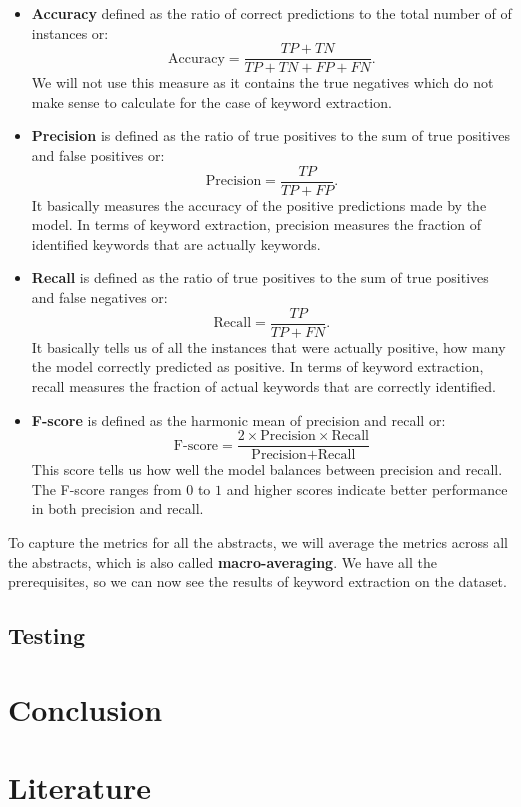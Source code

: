 \documentclass[12pt]{article}
\numberwithin{equation}{section}
\begin{document}
\begin{spacing}{1.5}
	\begin{itemize}
		\item \textbf{Accuracy} defined as the ratio of correct predictions to the total number of of instances or:
		$$ \text{Accuracy} = \frac{TP + TN}{TP + TN + FP + FN}. $$
		We will not use this measure as it contains the true negatives which do not make sense to calculate for the case of keyword extraction.
		\item \textbf{Precision} is defined as the ratio of true positives to the sum of true positives and false positives or:
		$$ \text{Precision} = \frac{TP}{TP + FP}. $$
		It basically measures the accuracy of the positive predictions made by the model. In terms of keyword extraction, precision measures the fraction of identified keywords that are actually keywords.
		
		\item \textbf{Recall} is defined as the ratio of true positives to the sum of true positives and false negatives or:
		$$ \text{Recall} = \frac{TP}{TP + FN}. $$
		It basically tells us of all the instances that were actually positive, how many the model correctly predicted as positive. In terms of keyword extraction, recall measures the fraction of actual keywords that are correctly identified.
		\item \textbf{F-score} is defined as the harmonic mean of precision and recall or:
		$$ \text{F-score} = \frac{2 \times \text{Precision} \times \text{Recall}}{\text{Precision} + \text{Recall}} $$
		This score tells us how well the model balances between precision and recall. The F-score ranges from $0$ to $1$ and higher scores indicate better performance in both precision and recall.  
	\end{itemize}
	To capture the metrics for all the abstracts, we will average the metrics across all the abstracts, which is also called \textbf{macro-averaging}. We have all the prerequisites, so we can now see the results of keyword extraction on the dataset.

	\subsection{Testing}
	
	\newpage
	\section{Conclusion}
	
	\newpage
	\section{Literature}
	

\end{spacing}
\end{document}

